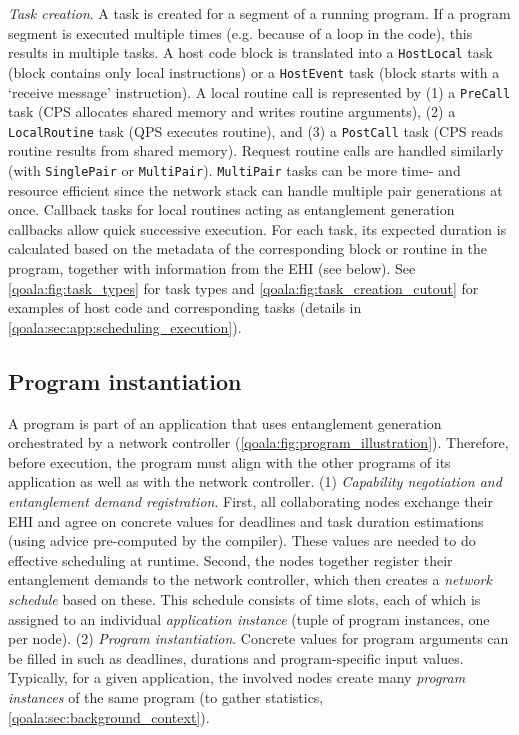 \textit{Task creation}. 
A task is created for a segment of a running program.
If a program segment is executed multiple times (e.g. because of a loop in the code), this results in multiple tasks.
A host code block is translated into a \texttt{HostLocal} task (block contains only local instructions) or a \texttt{HostEvent} task (block starts with a `receive message' instruction).
A local routine call is represented by (1) a \texttt{PreCall} task (CPS allocates shared memory and writes routine arguments), (2) a \texttt{LocalRoutine} task (QPS executes routine), and (3) a \texttt{PostCall} task (CPS reads routine results from shared memory).
Request routine calls are handled similarly (with \texttt{SinglePair} or \texttt{MultiPair}).
\texttt{MultiPair} tasks can be more time- and resource efficient since the network stack can handle multiple pair generations at once.
Callback tasks for local routines acting as entanglement generation callbacks allow quick successive execution.
For each task, its expected duration is calculated based on the metadata of the corresponding block or routine in the program, together with information from the EHI (see below).
See \cref{qoala:fig:task_types} for task types and \cref{qoala:fig:task_creation_cutout} for examples of host code and corresponding tasks (details in \cref{qoala:sec:app:scheduling_execution}).


\subsection{Program instantiation}
\label{qoala:sec:program_instantiation}
A program is part of an application that uses entanglement generation orchestrated by a network controller (\cref{qoala:fig:program_illustration}).
Therefore, before execution, the program must align with the other programs of its application as well as with the network controller.
(1) \textit{Capability negotiation and entanglement demand registration}.
First, all collaborating nodes exchange their EHI and agree on concrete values for deadlines and task duration estimations (using advice pre-computed by the compiler).
These values are needed to do effective scheduling at runtime.
Second, the nodes together register their entanglement demands to the network controller, which then creates a \textit{network schedule} based on these.
This schedule consists of time slots, each of which is assigned to an individual \textit{application instance} (tuple of program instances, one per node).
(2) \textit{Program instantiation}. Concrete values for program arguments can be filled in such as deadlines, durations and program-specific input values.
Typically, for a given application, the involved nodes create many \textit{program instances} of the same program (to gather statistics, \cref{qoala:sec:background_context}).


